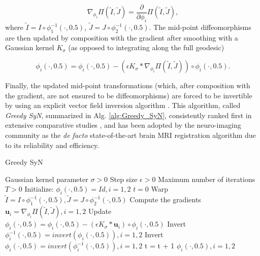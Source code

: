 \begin{equation}\label{eq:grad_metric}
    \nabla_{\phi_{i}} \Pi(\tilde{I}, \tilde{J}) = \frac{\partial}{\partial \phi_{i}} \Pi \left( \tilde{I}, \tilde{J}\right),
\end{equation}
where $\tilde{I} = I \circ \phi_{1}^{-1}(\cdot, 0.5)$, $\tilde{J} = J \circ \phi_{2}^{-1}(\cdot, 0.5)$. The mid-point diffeomorphisms are then updated by composition with
the gradient after smoothing with a Gaussian kernel $K_{\sigma}$ (as opposed to integrating along the full geodesic)

\begin{equation}\label{eq:gsyn_update}
    \phi_{i}(\cdot, 0.5) = \phi_{i}(\cdot, 0.5) - \left( \epsilon K_{\sigma} \ast \nabla_{\phi_{i}} \Pi(\tilde{I}, \tilde{J}) \right) \circ \phi_{i}(\cdot, 0.5).
\end{equation}

Finally, the updated mid-point transformations (which, after composition with the gradient, are not ensured to be diffeomorphisms) are forced to be invertible by using an
explicit vector field inversion algorithm \cite{Chen2008}. This algorithm, called \textit{Greedy SyN}, summarized in Alg. \eqref{alg:Greedy_SyN}, consistently ranked first in extensive comparative
studies \cite{Klein2009}\cite{Klein2010}\cite{Rohlfing2012}, and has been adopted by the neuro-imaging community as the \textit{de facto} state-of-the-art brain
MRI registration algorithm due to its reliability and efficiency.

\begin{algorithm}[h!]
\caption{Greedy SyN}\label{alg:Greedy_SyN}
\begin{algorithmic}[1]
\REQUIRE Gaussian kernel parameter $\sigma>0$
\REQUIRE Step size $\epsilon>0$
\REQUIRE Maximum number of iterations $T>0$
\STATE Initialize: $\phi_{i}(\cdot, 0.5) = Id, i=1, 2$
\STATE $t=0$
\REPEAT
    \STATE Warp $\tilde{I}  = I \circ \phi_{1}^{-1}(\cdot, 0.5), \tilde{J} = J \circ \phi_{2}^{-1}(\cdot, 0.5)$
    \STATE Compute the gradients $\mathbf{u}_{i} = \nabla_{\phi_{i}} \Pi(\tilde{I}, \tilde{J}), i=1,2$
    \STATE Update $\phi_{i}(\cdot, 0.5) = \phi_{i}(\cdot, 0.5) - \left( \epsilon K_{\sigma} \ast \mathbf{u}_{i} \right) \circ \phi_{i}(\cdot, 0.5)$
    \STATE Invert $\phi_{i}^{-1}(\cdot, 0.5) = invert (\phi_{i}(\cdot, 0.5)), i=1, 2$
    \STATE Invert $\phi_{i}(\cdot, 0.5) = invert (\phi_{i}^{-1}(\cdot, 0.5)), i=1, 2$
    \STATE t = t + 1
\RETURN $\phi_{i}(\cdot, 0.5), i=1,2$
\end{algorithmic}
\end{algorithm}

